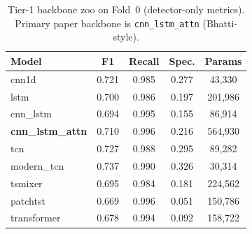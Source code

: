 \begin{table}[!t]
\centering
\caption{Tier-1 backbone zoo on Fold~0 (detector-only metrics). Primary paper backbone is \texttt{cnn\_lstm\_attn} (Bhatti-style).}
\label{tab:backbone}
\begin{tabular}{lcccc}
\toprule
Model & F1 & Recall & Spec. & Params \\
\midrule
cnn1d & 0.721 & 0.985 & 0.277 & 43,330 \\
lstm & 0.700 & 0.986 & 0.197 & 201,986 \\
cnn\_lstm & 0.694 & 0.995 & 0.155 & 86,914 \\
\textbf{cnn\_lstm\_attn} & 0.710 & 0.996 & 0.216 & 564,930 \\
tcn & 0.727 & 0.988 & 0.295 & 89,282 \\
modern\_tcn & 0.737 & 0.990 & 0.326 & 30,314 \\
tsmixer & 0.695 & 0.984 & 0.181 & 224,562 \\
patchtst & 0.669 & 0.996 & 0.051 & 150,786 \\
transformer & 0.678 & 0.994 & 0.092 & 158,722 \\
\bottomrule
\end{tabular}
\end{table}
